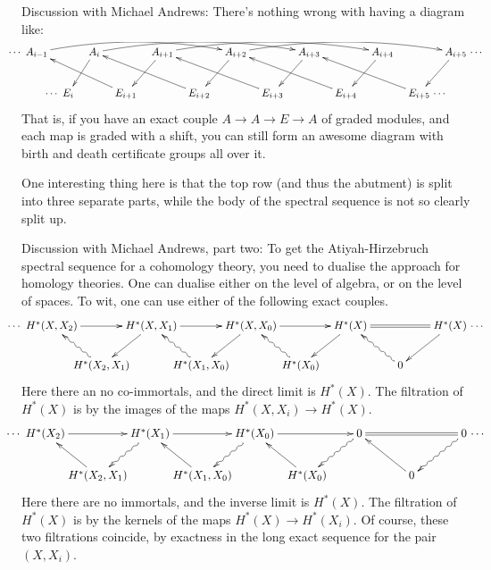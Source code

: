 \documentclass[11pt]{article}
\begin{document}
\begin{discussion with jandr}
{\color{red}Discussion with Michael Andrews:}
There's nothing wrong with having a diagram like:
\[\xymatrix@C=.3cm{
\makebox[0cm][r]{$\cdots$\ }
A_{i-1}\ar@/^1em/[rrrrrr]&&
A_{i  }\ar@/^1em/[rrrrrr]\ar[dl]&&
A_{i+1}\ar@/^1em/[rrrrrr]\ar[ld]&&
A_{i+2}\ar@/^1em/[rrrrrr]\ar[ld]&&
A_{i+3}\ar[ld]&&
A_{i+4}\ar[ld]&&
A_{i+5}\ar[dl]\makebox[0cm][l]{\ $\cdots$}\\
&
\makebox[0cm][r]{$\cdots$\ }
E_{i  }&&
E_{i+1}\ar[lllu]&&
E_{i+2}\ar[lllu]&&
E_{i+3}\ar[lllu]&&
E_{i+4}\ar[lllu]&&
E_{i+5}\ar[lllu]\makebox[0cm][l]{\ $\cdots$}
}\]
That is, if you have an exact couple $A\to A\to E\to A$ of graded modules, and
each map is graded with a shift, you can still form an awesome diagram with
birth and death certificate groups all over it.

One interesting thing here is that the top row (and thus the abutment) is split
into three separate parts, while the body of the spectral sequence is not so
clearly split up.

{\color{red}Discussion with Michael Andrews, part two:}
To get the Atiyah-Hirzebruch spectral sequence for a cohomology theory, you need
to dualise the approach for homology theories. One can dualise either on the
level of algebra, or on the level of spaces. To wit, one can use either of the
following exact couples.
\[\xymatrix@!0@C=1.6cm@R=1.28cm{%
\makebox[0cm][r]{$\cdots$\
}H^*(X,X_2)\ar[rr]&&H^*(X,X_1) \ar[rr]\ar[ld]&&H^*(X,X_0)\ar[rr]
\ar[ld]&&H^*(X)\ar[ld]
\ar@{=}[rr]&&H^*(X)\makebox[0cm][l]{\ $\cdots$}\ar[ld]\\
&H^*(X_2,X_1)\ar@{~>}[ul]&&
H^*(X_1,X_0)\ar@{~>}[lu]&&
H^*(X_0)\ar@{~>}[lu]&&
0\ar@{~>}[lu]
}\]
Here there an no co-immortals, and the direct limit is $H^*(X)$. The filtration
of $H^*(X)$ is by the images of the maps $H^*(X,X_i)\to H^*(X)$.
\[\xymatrix@!0@C=1.6cm@R=1.28cm{%
\makebox[0cm][r]{$\cdots$\ }
H^*(X_2)\ar[rr]&&
H^*(X_1)\ar[rr]\ar@{~>}[ld]&&
H^*(X_0)\ar[rr] \ar@{~>}[ld]&&\ar@{~>}[ld]
0\ar@{=}[rr]&&
0\makebox[0cm][l]{\ $\cdots$}\ar@{~>}[ld]\\
&H^*(X_2,X_1)\ar[ul]&&
H^*(X_1,X_0)\ar[lu]&&
H^*(X_0)\ar[lu]&&
0\ar[lu]
}\]
Here there are no immortals, and the inverse limit is $H^*(X)$. The filtration
of $H^*(X)$ is by the kernels of the maps $H^*(X)\to H^*(X_i)$. Of course, these
two filtrations coincide, by exactness in the long exact sequence for the pair
$(X,X_i)$.
\end{discussion with jandr}
\end{document}
